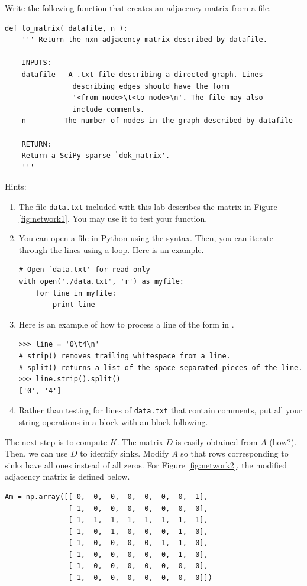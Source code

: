 \begin{problem}
Write the following function that creates an adjacency matrix from a file.
\begin{lstlisting}
def to_matrix( datafile, n ):
    ''' Return the nxn adjacency matrix described by datafile.
    
    INPUTS:
    datafile - A .txt file describing a directed graph. Lines 
    			describing edges should have the form 
				'<from node>\t<to node>\n'. The file may also 
				include comments.
    n		- The number of nodes in the graph described by datafile
    
    RETURN:
    Return a SciPy sparse `dok_matrix'.
    '''
\end{lstlisting}
Hints:
\begin{enumerate}
\item The file \texttt{data.txt} included with this lab describes the matrix in Figure \ref{fig:network1}. 
You may use it to test your function.

\item You can open a file in Python using the  syntax. 
Then, you can iterate through the lines using a  loop.
Here is an example.
\begin{lstlisting}
# Open `data.txt' for read-only
with open('./data.txt', 'r') as myfile:
    for line in myfile:
        print line
\end{lstlisting}

\item Here is an example of how to process a line of the form in .
\begin{lstlisting}
>>> line = '0\t4\n'
# strip() removes trailing whitespace from a line.
# split() returns a list of the space-separated pieces of the line.
>>> line.strip().split()
['0', '4']
\end{lstlisting}

\item Rather than testing for lines of \texttt{data.txt} that contain comments, put all your string operations in a  block with an  block following.
\end{enumerate}
\end{problem}

The next step is to compute $K$. 
The matrix $D$ is easily obtained from $A$ (how?). 
Then, we can use $D$ to identify sinks.
Modify $A$ so that rows corresponding to sinks have all ones instead of all zeros.
For Figure \ref{fig:network2}, the modified adjacency matrix is defined below.
\begin{lstlisting}
Am = np.array([[ 0,  0,  0,  0,  0,  0,  0,  1],
               [ 1,  0,  0,  0,  0,  0,  0,  0],
               [ 1,  1,  1,  1,  1,  1,  1,  1],
               [ 1,  0,  1,  0,  0,  0,  1,  0],
               [ 1,  0,  0,  0,  0,  1,  1,  0],
               [ 1,  0,  0,  0,  0,  0,  1,  0],
               [ 1,  0,  0,  0,  0,  0,  0,  0],
               [ 1,  0,  0,  0,  0,  0,  0,  0]])
\end{lstlisting}

